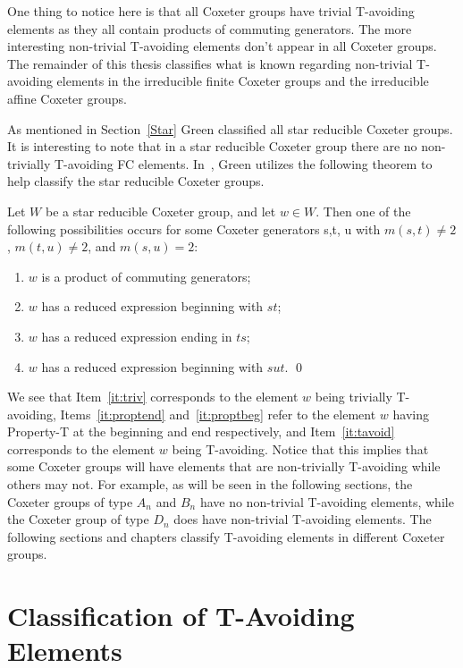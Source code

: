 One thing to notice here is that all Coxeter groups have trivial T-avoiding elements as they all contain products of commuting generators. The more interesting non-trivial T-avoiding elements don't appear in all Coxeter groups. The remainder of this thesis classifies what is known regarding non-trivial T-avoiding elements in the irreducible finite Coxeter groups and the irreducible affine Coxeter groups. 

As mentioned in Section~\ref{Star} Green classified all star reducible Coxeter groups. It is interesting to note that in a star reducible Coxeter group there are no non-trivially T-avoiding FC elements. In~\cite{Green2006a}, Green utilizes the following theorem to help classify the star reducible Coxeter groups. 
\begin{theorem}
	Let $W$ be a star reducible Coxeter group, and let $w \in W$. Then one of the following possibilities occurs for some Coxeter generators s,t, u with $m(s,t) \neq 2$, $m(t,u) \neq 2$, and $m(s,u)=2$:
	\begin{enumerate}
	\item $w$ is a product of commuting generators;\label{it:triv}
	\item $w$ has a reduced expression beginning with $st$;\label{it:proptend}
	\item $w$ has a reduced expression ending in $ts$;\label{it:proptbeg}
	\item $w$ has a reduced expression beginning with $sut$.\label{it:tavoid}	\qed
	\end{enumerate}
\end{theorem}

We see that Item~\ref{it:triv} corresponds to the element $w$ being trivially T-avoiding, Items~\ref{it:proptend} and~\ref{it:proptbeg} refer to the element $w$ having Property-T at the beginning and end respectively, and Item~\ref{it:tavoid} corresponds to the element $w$ being T-avoiding. Notice that this implies that some Coxeter groups will have elements that are non-trivially T-avoiding while others may not. For example, as will be seen in the following sections, the Coxeter groups of type $A_n$ and $B_n$ have no non-trivial T-avoiding elements, while the Coxeter group of type $D_n$ does have non-trivial T-avoiding elements. The following sections and chapters classify T-avoiding elements in different Coxeter groups. 


\section{Classification of T-Avoiding Elements}\label{tavoid}

